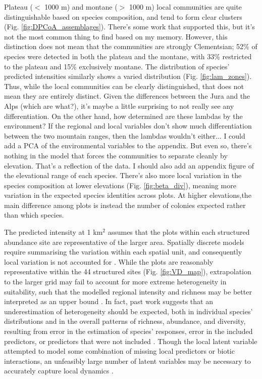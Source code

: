 \documentclass[preprint,final,times,12pt,3p]{elsarticle}
\begin{document}
Plateau ($<$ 1000 m) and montane ($>$ 1000 m) local communities are quite distinguishable based on species composition, and tend to form clear clusters (Fig. \ref{fig:DPCoA_assemblages}). There's some work that supported this, but it's not the most common thing to find based on my memory. However, this distinction does not mean that the communities are strongly Clementsian; 52\% of species were detected in both the plateau and the montane, with 33\% restricted to the plateau and 15\% exclusively montane. The distribution of species' predicted intensities similarly shows a varied distribution (Fig. \ref{fig:lam_zones}). Thus, while the local communities can be clearly distinguished, that does not mean they are entirely distinct. Given the differences between the Jura and the Alps (which are what?), it's maybe a little surprising to not really see any differentiation. On the other hand, how determined are these lambdas by the environment? If the regional and local variables don't show much differentiation between the two mountain ranges, then the lambdas wouldn't either... I could add a PCA of the environmental variables to the appendix. But even so, there's nothing in the model that forces the communities to separate cleanly by elevation. That's a reflection of the data. I should also add an appendix figure of the elevational range of each species. There's also more local variation in the species composition at lower elevations (Fig. \ref{fig:beta_div}), meaning more variation in the expected species identities across plots. At higher elevations,the main difference among plots is instead the number of colonies expected rather than which species.

The predicted intensity at 1 km$^2$ assumes that the plots within each structured abundance site are representative of the larger area. Spatially discrete models require summarising the variation within each spatial unit, and consequently local variation is not accounted for \citep{Calabrese2014,Frishkoff2019,AminiTehrani2020}. While the plots are reasonably representative within the 44 structured sites (Fig. \ref{fig:VD_map}), extrapolation to the larger grid may fail to account for more extreme heterogeneity in suitability, such that the modelled regional intensity and richness may be better interpreted as an upper bound \citep{Guillera-Arroita2019,Altwegg2019,Johnston2020}. In fact, past work suggests that an underestimation of heterogeneity should be expected, both in individual species' distributions and in the overall patterns of richness, abundance, and diversity, resulting from error in the estimation of species' responses, error in the included predictors, or predictors that were not included \citep{Calabrese2014,Biber2019,Guillera-Arroita2019}. Though the local latent variable attempted to model some combination of missing local predictors or biotic interactions, an unfeasibly large number of latent variables may be necessary to accurately capture local dynamics \citep{Ovaskainen2016}. 
\end{document}
